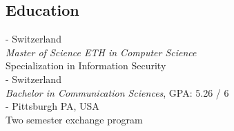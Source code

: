 \documentclass[mm, 11pt]{simple_style}
\begin{document}
\begin{resume}
\section{Education}
 - Switzerland \\
{\sl Master of Science ETH in Computer Science}\\
Specialization in Information Security\\
 - Switzerland  \\
{\sl Bachelor in Communication Sciences}, GPA: 5.26 / 6\\
 - Pittsburgh PA, USA \\
Two semester exchange program\\
\sectionline

\end{resume}
\end{document}
